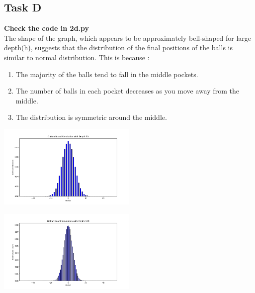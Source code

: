 \documentclass[12pt]{article}
\begin{document}
\subsection{Task D}
\textbf{Check the code in 2d.py} \\
The shape of the graph, which appears to be approximately bell-shaped for large depth(h), suggests that the distribution of the final positions of the balls is similar to normal distribution.
\newline
This is because :
\begin{enumerate}
    \item The majority of the balls tend to fall in the middle pockets.
    \item The number of balls in each pocket decreases as you move away from the middle.
    \item The distribution is symmetric around the middle.
\end{enumerate}
\begin{minipage}{\linewidth}
    \begin{center}
        \includegraphics[width=0.5\textwidth]{images/2d2.png}
    \end{center}
\end{minipage}
\begin{minipage}{\linewidth}
    \begin{center}
        \includegraphics[width=0.5\textwidth]{images/2d3.png}
    \end{center}
\end{minipage}
\end{document}
